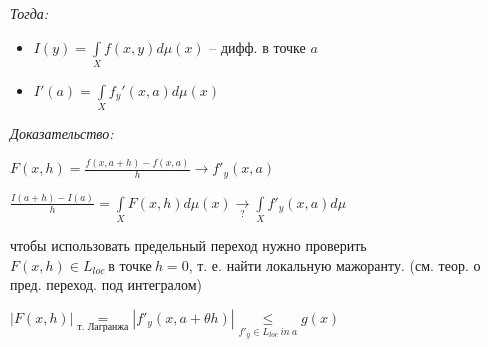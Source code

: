 \documentclass[paper=a4, fontsize=17pt]{article}
\begin{document}
\emph{Тогда:}
\begin{itemize}
	\item $ I(y) = \int\limits_{X} f(x, y) d\mu(x) $ -- дифф. в точке $ a $
	\item $ I'(a) = \int\limits_{X} f_y'(x, a) d\mu(x) $
\end{itemize}

\emph{Доказательство:}

	$ F(x, h) = \frac{f(x, a + h) - f(x, a)}{h} \rightarrow f'_y(x, a) $

	$ \frac{I(a + h) - I(a)}{h} = \int\limits_X F(x, h) d\mu(x)
	  \underset{?}{\rightarrow} \int\limits_X f'_y(x, a) d\mu$

	  чтобы использовать предельный переход нужно проверить
	  $ F(x, h) \in L_{loc} ~ \text{в точке} ~  h = 0 $, т. е. найти локальную мажоранту. (см. теор. о пред. переход. под интегралом)

	$ |F(x, h)| \underset{\text{т. Лагранжа}}{=}
	|f'_y(x, a + \theta h)| \underset{f'_y \in L_{loc} ~ in ~ a}{\leq} g(x) $
\end{document}
